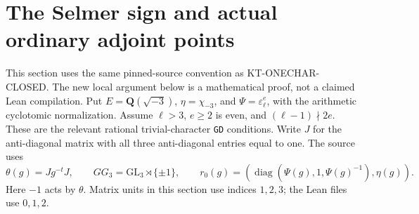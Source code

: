 \documentclass[11pt,a4paper]{article}
\theoremstyle{definition}
\begin{document}


\section{The Selmer sign and actual ordinary adjoint points}
\label{sec:kt-host-sign}

This section uses the same pinned-source convention as
KT-ONECHAR-CLOSED.  The new local argument below is a mathematical
proof, not a claimed Lean compilation.  Put
$E=\mathbf Q(\sqrt{-3})$, $\eta=\chi_{-3}$, and
$\Psi=\varepsilon_\ell^e$, with the arithmetic cyclotomic
normalization.  Assume $\ell>3$, $e\geq2$ is even, and
$(\ell-1)\nmid2e$.  These are the relevant rational trivial-character
\texttt{GD} conditions.  Write $J$ for the anti-diagonal matrix with
all three anti-diagonal entries equal to one.  The source uses
\[
 \theta(g)=Jg^{-t}J,\qquad
 GG_3=\mathrm{GL}_3\rtimes\{\pm1\},\qquad
 r_0(g)=(\operatorname{diag}(\Psi(g),1,\Psi(g)^{-1}),\eta(g)).
                                                               \tag{HS.1}
\]
Here $-1$ acts by $\theta$.  Matrix units in this section use
indices $1,2,3$; the Lean files use $0,1,2$.
\end{document}
